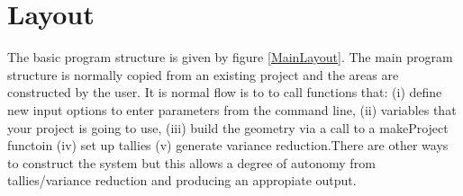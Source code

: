 \section{Layout}
\label{Sec:Layout}

The basic program structure is given by figure \ref{MainLayout}.  The
main program structure is normally copied from an existing project and
the areas are constructed by the user. It is normal flow is to to call
functions that: (i) define new input options to enter parameters from the
command line, (ii) variables that your project is going to use,
(iii)  build the geometry via a call to a makeProject functoin (iv)
set up tallies (v) generate variance reduction.There are other ways
to construct the system but this allows a degree of autonomy from
tallies/variance reduction and producing an appropiate output.

